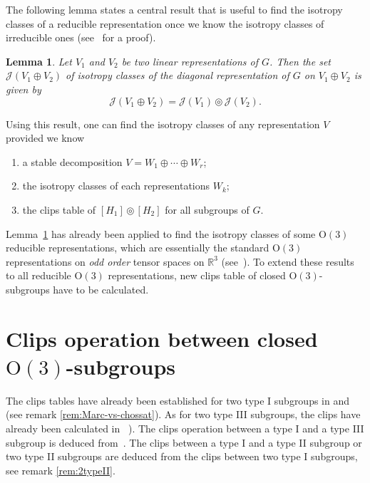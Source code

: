 \documentclass[11pt,a4paper]{amsart}
\newtheorem{lem}[thm]{Lemma}
\theoremstyle{definition}
\newcommand{\RR}{\mathbb{R}}                %
\newcommand{\J}{\mathcal{J}}                %
\newcommand{\OO}{\mathrm{O}}                %
\newcommand{\1}{\mathds{1}}		            %
\begin{document}
The following lemma states a central result that is useful to find the isotropy classes of a reducible representation once we know the isotropy classes of irreducible ones (see~\cite{Olive2019} for a proof).

\begin{lem}\label{lem:direct_sum}
  Let $V_1$ and $V_2$ be two linear representations of $G$. Then the set $\J(V_1\oplus V_2)$ of isotropy classes of the diagonal representation of $G$ on $V_1\oplus V_2$ is given by
  \begin{equation*}
    \J(V_1\oplus V_2)=\J(V_1)\circledcirc\J(V_2).
  \end{equation*}
\end{lem}

Using this result, one can find the isotropy classes of any representation $V$ provided we know
\begin{enumerate}
  \item a stable decomposition $V=W_1\oplus \dotsb \oplus W_r$;
  \item the isotropy classes of each representations $W_k$;
  \item the clips table of $[H_1]\circledcirc [H_2]$ for all subgroups of $G$.
\end{enumerate}

Lemma~\ref{lem:direct_sum} has already been applied to find the isotropy classes of some $\OO(3)$ reducible representations, which are essentially the standard $\OO(3)$ representations on \emph{odd order} tensor spaces on $\RR^3$ (see~\cite{Olive2014,Olive2019}). To extend these results to all reducible $\OO(3)$ representations, new clips table of closed $\OO(3)$-subgroups have to be calculated.

\section{Clips operation between closed $\OO(3)$-subgroups}
\label{sec:main_result}

The clips tables have already been established for two type I subgroups in \cite[table 1]{Chossat1994} and \cite[Table 1]{Olive2019} (see remark \ref{rem:Marc-vs-chossat}). As for two type III subgroups, the clips have already been calculated in ~\cite[Table 2]{Olive2019}). The clips operation between a type I and a type III subgroup is deduced from~\cite[Lemma 5.4]{Olive2019}. The clips between a type I and a type II subgroup or two type II subgroups are deduced from the clips between two type I subgroups, see remark \ref{rem:2typeII}.
\end{document}
